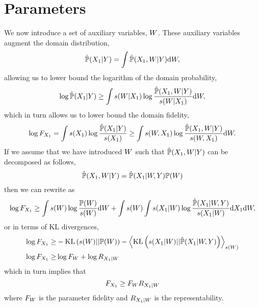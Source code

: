 \documentclass[]{article}
\begin{document}
\section{Parameters}

We now introduce a set of auxiliary variables, $W$. These auxiliary variables augment the domain distribution,
\[
\hat{\mathbb{P}}({X_1} | Y) = \int \hat{\mathbb{P}}({X_1}, W | Y) \text{d} W,
\]
allowing us to lower bound the logarithm of the domain probability,
\[
\log \hat{\mathbb{P}}({X_1} | Y) \geq \int s(W|{X_1}) \log \frac{\hat{\mathbb{P}}({X_1}, W | Y)}{s(W|{X_1})} \text{d}W,
\]
which in turn allows us to lower bound the domain fidelity, 
\[
\log F_{X_1} = \int s({X_1}) \log \frac{\hat{\mathbb{P}}({X_1} | Y)}{s({X_1})} \geq \int s(W,{X_1}) \log \frac{\hat{\mathbb{P}}({X_1}, W | Y)}{s(W,{X_1})} \text{d}W.
\]
If we assume that we have introduced $W$ such that $\hat{\mathbb{P}}({X_1}, W| Y)$ can be decomposed as follows,
\[
\hat{\mathbb{P}}({X_1}, W| Y) = \hat{\mathbb{P}}({X_1}| W, Y) \mathbb{P}(W)
\]
then we can rewrite as
\[
\log F_{X_1} \geq \int s(W) \log \frac{\mathbb{P}(W)}{s(W)}\text{d} W + \int s(W) \int s({X_1}|W) \log \frac{\hat{\mathbb{P}}({X_1}|W, Y)}{s({X_1}|W)} \text{d} {X_1} \text{d}W,
\]
or in terms of KL divergences,
\begin{align*}
\log F_{X_1} \geq & -\text{KL}\left(s(W)|| \mathbb{P}(W)\right) - \left\langle  \text{KL}\left(s({X_1}|W) || \hat{\mathbb{P}}({X_1}|W, Y) \right) \right\rangle_{ s(W)} \\
\log F_{X_1} \geq & \log F_W + \log R_{{X_1}|W}
\end{align*}
which in turn implies that
$$
F_{X_1} \geq F_W R_{{X_1}|W}
$$
where $F_W$ is the parameter fidelity and $R_{{X_1}|W}$ is the representability. 
\end{document}
